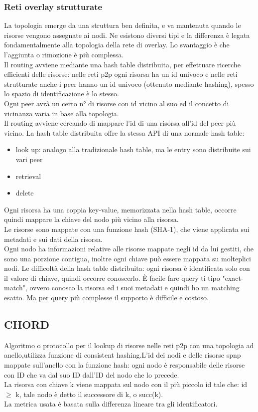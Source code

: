 \documentclass[16px]{article}
\begin{document}
\subsubsection{Reti overlay strutturate}
La topologia emerge da una struttura ben definita, e va mantenuta quando le risorse vengono assegnate ai nodi. Ne esistono diversi tipi e la differenza è legata fondamentalmente alla topologia della rete di overlay. Lo svantaggio è che l'aggiunta o rimozione è più complessa.\\ Il routing avviene mediante una hash table distribuita, per effettuare ricerche efficienti delle risorse: nelle reti p2p ogni risorsa ha un id univoco e nelle reti strutturate anche i peer hanno un id univoco (ottenuto mediante hashing), spesso lo spazio di identificazione è lo stesso.\\ Ogni peer avrà un certo n° di risorse con id vicino al suo ed il concetto di vicinanza varia in base alla topologia.\\ Il routing avviene cercando di mappare l'id di una risorsa all'id del peer più vicino. La hash table distribuita offre la stessa API di una normale hash table:
\begin{itemize}
\item look up: analogo alla tradizionale hash table, ma le entry sono distribuite sui vari peer
\item retrieval
\item delete
\end{itemize}
Ogni risorsa ha una coppia key-value, memorizzata nella hash table, occorre quindi mappare la chiave del nodo più vicino alla risorsa.\\ Le risorse sono mappate con una funzione hash (SHA-1), che viene applicata sui metadati e sui dati della risorsa.\\ Ogni nodo ha informazioni relative alle risorse mappate negli id da lui gestiti, che sono una porzione contigua, inoltre ogni chiave può essere mappata su molteplici nodi. Le difficoltà della hash table distribuita: ogni risorsa è identificata solo con il valore di chiave, quindi occorre conoscerlo. È facile fare query ti tipo "exact-match", ovvero conosco la risorsa ed i suoi metadati e quindi ho un matching esatto. Ma per query più complesse il supporto è difficile e costoso.
\subsection{CHORD}
Algoritmo o protocollo per il lookup di risorse nelle reti p2p con una topologia ad anello,utilizza funzione di consistent hashing.L'id dei nodi e delle risorse spnp mappate sull'anello con la funzione hash: ogni nodo è responsabile delle risorse con ID che va dal suo ID dall'ID del nodo che lo precede.\\ La risorsa con chiave k viene mappata sul nodo con il più piccolo id tale che: id $\geq$ k, tale nodo è detto il successore di k, o succ(k).\\ La metrica usata è basata sulla differenza lineare tra gli identificatori.
\end{document}
